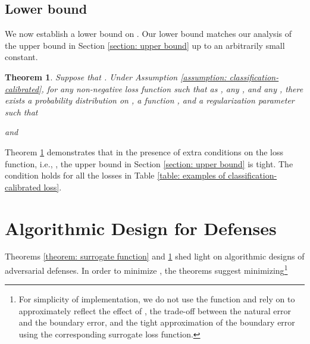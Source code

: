 \documentclass[11pt]{article}
\newtheorem{theorem}{Theorem}[section]
\newcommand{\0}{\mathbf{0}}
\newcommand{\1}{\mathbf{1}}
\renewcommand{\comment}[1]{}
\begin{document}
\comment{
\noindent{\textbf{Trade-off Regarding Model Capacity.}}
Theorem \ref{theorem: surrogate function} implies a potential trade-off regarding the model capacity :

We note that term (a), the approximation term, shrinks as the model capacity increases. Term (b), however, may grow with the increase of model capacity (see Appendix \ref{section: adversarial vulnerability under log-concave distributions} for an example).
}





\vspace{-0.1cm}
\subsection{Lower bound}
\label{section: lower bound}

We now establish a lower bound on . Our lower bound matches our analysis of the upper bound in Section \ref{section: upper bound} up to an arbitrarily small constant.

\begin{theorem}
\label{theorem: tightness of surrogate loss}
Suppose that . Under Assumption \ref{assumption: classification-calibrated}, for any non-negative loss function  such that  as , any , and any , there exists a probability distribution on , a function , and a regularization parameter  such that

and

\end{theorem}

Theorem \ref{theorem: tightness of surrogate loss} demonstrates that in the presence of extra conditions on the loss function, i.e., , the upper bound in Section \ref{section: upper bound} is tight. The condition holds for all the losses in Table \ref{table: examples of classification-calibrated loss}.


\section{Algorithmic Design for Defenses}
\label{section: algorithmic design for adversarial defenses}

Theorems \ref{theorem: surrogate function} and \ref{theorem: tightness of surrogate loss} shed light on algorithmic designs of adversarial defenses.
In order to minimize , the theorems suggest minimizing\footnote{For simplicity of implementation, we do not use the function  and rely on  to approximately reflect the effect of , the trade-off between the natural error and the boundary error, and the tight approximation of the boundary error using the corresponding surrogate loss function. }
\end{document}
